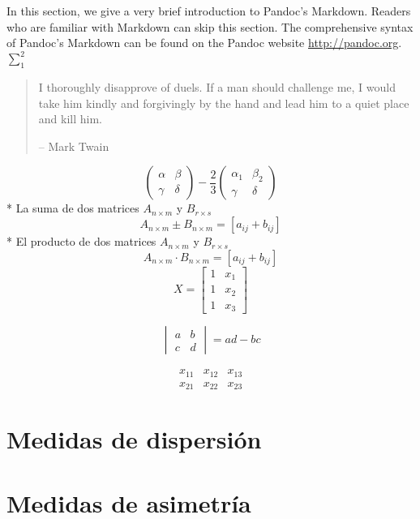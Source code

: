 \documentclass[10pt,]{krantz}
\theoremstyle{definition}
\theoremstyle{definition}
\theoremstyle{definition}
\theoremstyle{remark}
\begin{document}
In this section, we give a very brief introduction to Pandoc's Markdown. Readers who are familiar with Markdown can skip this section. The comprehensive syntax of Pandoc's Markdown can be found on the Pandoc website \url{http://pandoc.org}. \(\sum_1^2\)

\begin{quote}
I thoroughly disapprove of duels. If a man should challenge me,
I would take him kindly and forgivingly by the hand and lead him
to a quiet place and kill him.

-- Mark Twain
\end{quote}

\[\begin{pmatrix}\alpha & \beta\\
\gamma & \delta
\end{pmatrix}-\frac{2}{3} \begin{pmatrix}\alpha_1 & \beta_2\\
\gamma & \delta
\end{pmatrix}\]
* La suma de dos matrices \(A_{n\times m}\) y \(B_{r\times s}\) \[A_{n\times m}\pm B_{n\times m}=[a_{ij}+b_{ij}]\]
* El producto de dos matrices \(A_{n\times m}\) y \(B_{r\times s}\) \[A_{n\times m}\cdot B_{n\times m}=[a_{ij}+b_{ij}]\]
\[X = \begin{bmatrix}1 & x_{1}\\
1 & x_{2}\\
1 & x_{3}
\end{bmatrix}\]

\[\begin{vmatrix}a & b\\
c & d
\end{vmatrix}=ad-bc\]

\[\begin{array}{ccc}
x_{11} & x_{12} & x_{13}\\
x_{21} & x_{22} & x_{23}
\end{array}\]

\hypertarget{medidas-de-dispersiuxf3n}{%
\chapter{Medidas de dispersión}\label{medidas-de-dispersiuxf3n}}

\hypertarget{medidas-de-asimetruxeda}{%
\chapter{Medidas de asimetría}\label{medidas-de-asimetruxeda}}
\end{document}
